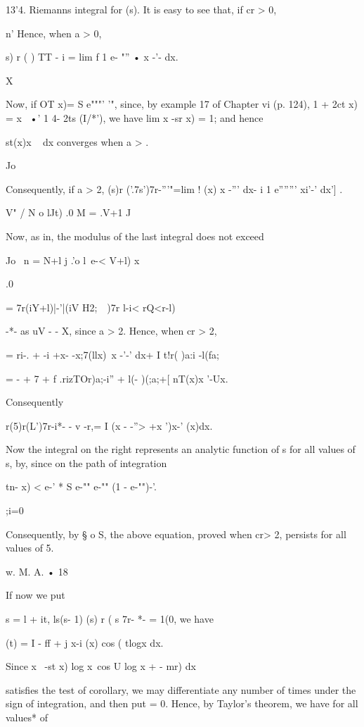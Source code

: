 13'4. Riemanns integral for (s). It is easy to see that, if cr > 0,

n' Hence, when a > 0,

   s) r ( ) TT - i = lim f 1 e- "'' • x -'- dx.

X

Now, if OT x)= S e"""' '", since, by example 17 of Chapter vi (p.
124), 1 + 2ct x) = x~ •' 1 4- 2ts (I/*'), we have lim x -sr x) = 1;
and hence

 st(x)x ~ dx converges when a > .

Jo

Consequently, if a > 2, (s)r ('.7s')7r-'''"=lim ! (x) x -''' dx- i 1
e''''''' xi'-' dx'] .

V" / N o lJt) .0 M = .V+1 J

Now, as in, the modulus of the last integral does not exceed

Jo \ n = N+l j .'o l\ e-< V+l) x

.0

= 7r(iY+l)|-'|(iV H2;\ \ )7r l-i< rQ<r-l)

-*- as uV - - X, since a > 2. Hence, when cr > 2,

= ri-. + -i +x- -x;7(llx)\ x -'-' dx+ I t!r( )a:i -l(fa;

= - + 7 + f .rizTOr)a;-i'' + l(- )(;a;+[ nT(x)x '-Ux.

Consequently

r(5)r(L')7r-i*- - v -r,= I (x - -''> +x ')x-' (x)dx.

Now the integral on the right represents an analytic function of s for
all values of s, by, since on the path of integration

tn- x) < e-' * S e-"" e-"" (1 - e-"")-'.

;i=0

Consequently, by § o S, the above equation, proved when cr> 2,
persists for all values of 5.

w. M. A. • 18

%
%

If now we put

s = l + it, ls(s- 1) (s) r ( s 7r- *- = 1(0, we have

  (t) = I - ff + j x-i (x) cos ( tlogx dx.

Since x~ -st x) log x\ cos U log x + - mr) dx

satisfies the test of corollary, we may differentiate any
number of times under the sign of integration, and then put = 0.
Hence, by Taylor's theorem, we have for all values* of

